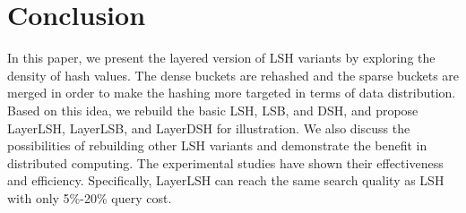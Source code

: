 \section{Conclusion}
\label{sec:conclusion}

In this paper, we present the layered version of LSH variants by exploring the density of hash values. The dense buckets are rehashed and the sparse buckets are merged in order to make the hashing more targeted in terms of data distribution. Based on this idea, we rebuild the basic LSH, LSB, and DSH, and propose LayerLSH, LayerLSB, and LayerDSH for illustration. We also discuss the possibilities of rebuilding other LSH variants and demonstrate the benefit in distributed computing. The experimental studies have shown their effectiveness and efficiency. Specifically, LayerLSH can reach the same search quality as LSH with only 5\%-20\% query cost.